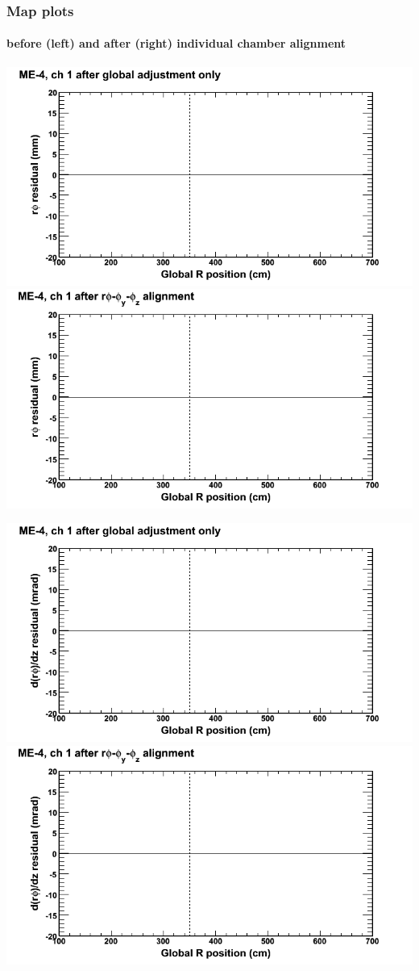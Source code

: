 \documentclass[compress]{beamer}
\begin{document}
\begin{frame}
\frametitle{Map plots}
\framesubtitle{before (left) and after (right) individual chamber alignment}
\includegraphics[width=0.5\linewidth]{ringmapplots_3dof/before_CSCvsr_mem4ch01_x.png} \includegraphics[width=0.5\linewidth]{ringmapplots_3dof/after_CSCvsr_mem4ch01_x.png}

\includegraphics[width=0.5\linewidth]{ringmapplots_3dof/before_CSCvsr_mem4ch01_dxdz.png} \includegraphics[width=0.5\linewidth]{ringmapplots_3dof/after_CSCvsr_mem4ch01_dxdz.png}
\end{frame}
\end{document}
